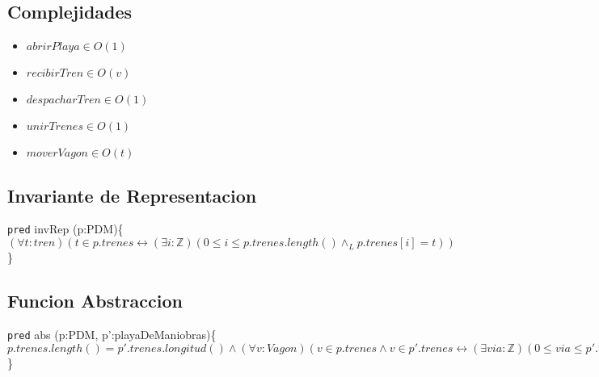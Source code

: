 \documentclass{article}
\newcommand{\invRep}[2]{\noindent\texttt{pred} invRep (#1)\{$#2$\}\\}
\newcommand{\abst}[2]{\noindent\texttt{pred} abs (#1)\{$#2$\}\\}
\newcommand{\entero}{\mathbb{Z}}
\begin{document}
\subsection{Complejidades}
\begin{itemize}
    \item $abrirPlaya\in O(1)$
    \item $recibirTren\in O(v)$
    \item $despacharTren\in O(1)$
    \item $unirTrenes\in O(1)$
    \item $moverVagon\in O(t)$
\end{itemize}

\subsection{Invariante de Representacion}
\invRep{p:PDM}{(\forall t:tren)(t\in p.trenes \leftrightarrow (\exists i:\entero)(0\leq i\leq p.trenes.length()\land_L p.trenes[i]=t))}

\subsection{Funcion Abstraccion}
\abst{p:PDM, p':playaDeManiobras}{p.trenes.length()=p'.trenes.longitud() \land (\forall v:Vagon)(v\in p.trenes \land v\in p'.trenes \leftrightarrow
 (\exists via:\entero)(0\leq via\leq p'.trenes.longitud()\land_L 
 (\exists vag:\entero)(0\leq vag\leq p'.trenes[vag].longitud() \land_L p.trenes[via][vag]=p'.trenes[via][vag]=v)))}

\section{}
\end{document}
